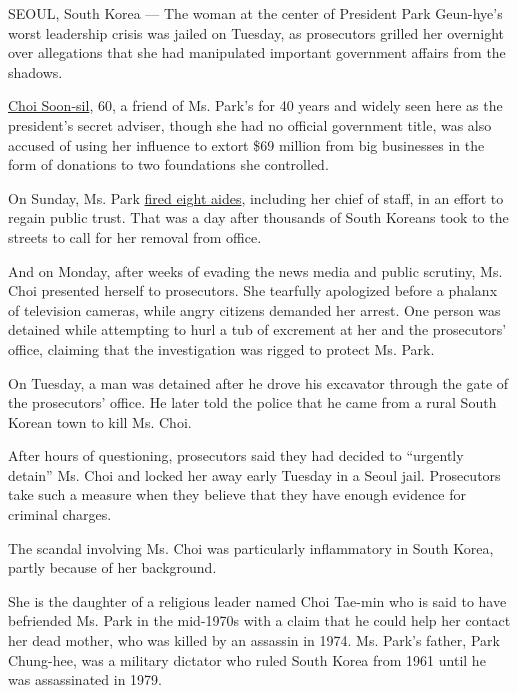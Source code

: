 SEOUL, South Korea --- The woman at the center of President Park
Geun-hye's worst leadership crisis was jailed on Tuesday, as prosecutors
grilled her overnight over allegations that she had manipulated
important government affairs from the shadows.

\href{http://www.nytimes3xbfgragh.onion/2016/10/28/world/asia/south-korea-choi-soon-sil.html}{Choi
Soon-sil}, 60, a friend of Ms. Park's for 40 years and widely seen here
as the president's secret adviser, though she had no official government
title, was also accused of using her influence to extort \$69 million
from big businesses in the form of donations to two foundations she
controlled.

On Sunday, Ms. Park
\href{http://www.nytimes3xbfgragh.onion/2016/10/31/world/asia/south-korea-choi-soon-sil.html?rref=collection\%2Ftimestopic\%2FSouth\%20Korea\&action=click\&contentCollection=world\&region=stream\&module=stream_unit\&version=latest\&contentPlacement=1\&pgtype=collection}{fired
eight aides}, including her chief of staff, in an effort to regain
public trust. That was a day after thousands of South Koreans took to
the streets to call for her removal from office.

And on Monday, after weeks of evading the news media and public
scrutiny, Ms. Choi presented herself to prosecutors. She tearfully
apologized before a phalanx of television cameras, while angry citizens
demanded her arrest. One person was detained while attempting to hurl a
tub of excrement at her and the prosecutors' office, claiming that the
investigation was rigged to protect Ms. Park.

On Tuesday, a man was detained after he drove his excavator through the
gate of the prosecutors' office. He later told the police that he came
from a rural South Korean town to kill Ms. Choi.

After hours of questioning, prosecutors said they had decided to
``urgently detain'' Ms. Choi and locked her away early Tuesday in a
Seoul jail. Prosecutors take such a measure when they believe that they
have enough evidence for criminal charges.

The scandal involving Ms. Choi was particularly inflammatory in South
Korea, partly because of her background.

She is the daughter of a religious leader named Choi Tae-min who is said
to have befriended Ms. Park in the mid-1970s with a claim that he could
help her contact her dead mother, who was killed by an assassin in 1974.
Ms. Park's father, Park Chung-hee, was a military dictator who ruled
South Korea from 1961 until he was assassinated in 1979.

